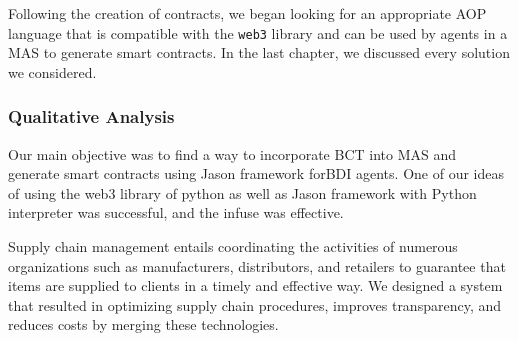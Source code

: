 Following the creation of contracts, we began looking for an appropriate \ac{AOP} language that is compatible with the \texttt{web3} library and can be used by agents in a \ac{MAS} to generate smart contracts. In the last chapter, we discussed every solution we considered. 

\subsubsection{Qualitative Analysis}
Our main objective was to find a way to incorporate \ac{BCT} into \ac{MAS} and generate smart contracts using Jason framework for\ac{BDI} agents. One of our ideas of using the web3 library of python as well as Jason framework with Python interpreter was successful, and the infuse was effective.

Supply chain management entails coordinating the activities of numerous organizations such as manufacturers, distributors, and retailers to guarantee that items are supplied to clients in a timely and effective way. We designed a system that resulted in optimizing supply chain procedures, improves transparency, and reduces costs by merging these technologies.